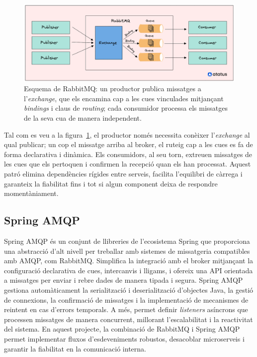 \begin{figure}[H]
\centering
  \includegraphics[width=0.9\linewidth]{Figures/rabbitmq-exchanges-and-queues.png}
  \caption{Esquema de RabbitMQ: un productor publica missatges a l'\emph{exchange}, que els
  encamina cap a les cues vinculades mitjançant \emph{bindings} i claus de \textit{routing};
  cada consumidor processa els missatges de la seva cua de manera independent.}
\label{fig:rabbitmq-flow}
\end{figure}

Tal com es veu a la figura~\ref{fig:rabbitmq-flow}, el productor només necessita conèixer
l'\emph{exchange} al qual publicar; un cop el missatge arriba al broker, el ruteig cap a les cues
es fa de forma declarativa i dinàmica.  
Els consumidors, al seu torn, extreuen missatges de les cues que els pertoquen i confirmen la recepció
quan els han processat. Aquest patró elimina dependències rígides entre serveis, facilita
l'equilibri de càrrega i garanteix la fiabilitat fins i tot si algun component deixa de respondre
momentàniament.

\subsection*{Spring AMQP}

Spring AMQP és un conjunt de llibreries de l'ecosistema Spring que proporciona una abstracció d'alt nivell per treballar amb sistemes de missatgeria compatibles amb AMQP, com RabbitMQ. Simplifica la integració amb el broker mitjançant la configuració declarativa de cues, intercanvis i lligams, i ofereix una API orientada a missatges per enviar i rebre dades de manera tipada i segura. Spring AMQP gestiona automàticament la serialització i deserialització d'objectes Java, la gestió de connexions, la confirmació de missatges i la implementació de mecanismes de reintent en cas d'errors temporals. A més, permet definir \emph{listeners} asíncrons que processen missatges de manera concurrent, millorant l'escalabilitat i la reactivitat del sistema. En aquest projecte, la combinació de RabbitMQ i Spring AMQP permet implementar fluxos d'esdeveniments robustos, desacoblar microserveis i garantir la fiabilitat en la comunicació interna.

